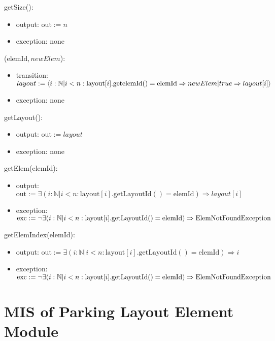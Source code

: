 \documentclass[12pt, titlepage]{article}
\begin{document}
\noindent getSize():
\begin{itemize} 
\item output: $\text{out} := n$
\item exception: none
\end{itemize}

\noindent {}($\text{elemId}, newElem$):
\begin{itemize} 
\item transition: $layout := \langle i:\mathbb{N} | i < n :
\text{layout}[i].\text{get\text{elemId}}() = \text{elemId} \Rightarrow newElem |
true \Rightarrow layout[i] \rangle$
\item exception: none
\end{itemize}

\noindent getLayout():
\begin{itemize} 
\item output: $\text{out} := layout$
\item exception: none
\end{itemize}

\noindent getElem($\text{elemId}$):
\begin{itemize} 
\item output: $\text{out} := \exists (i:\mathbb{N}|i < n :
\text{layout}[i].\text{getLayoutId}() = \text{elemId}) \Rightarrow layout[i]$
\item exception: $\text{exc} := \neg \exists (i:\mathbb{N}|i < n :
\text{layout}[i].\text{getLayoutId}() = \text{elemId}) \Rightarrow \\
\text{ElemNotFoundException}$
\end{itemize}

\noindent getElemIndex($\text{elemId}$):
\begin{itemize} 
\item output: $\text{out} := \exists (i:\mathbb{N}|i < n :
\text{layout}[i].\text{getLayoutId}() = \text{elemId}) \Rightarrow i$
\item exception: $\text{exc} := \neg \exists (i:\mathbb{N}|i < n :
\text{layout}[i].\text{getLayoutId}() = \text{elemId}) \Rightarrow \\
\text{ElemNotFoundException}$
\end{itemize}

\newpage

\section{MIS of Parking Layout Element Module} 
\label{parkingLayoutElem:Module}
\end{document}
